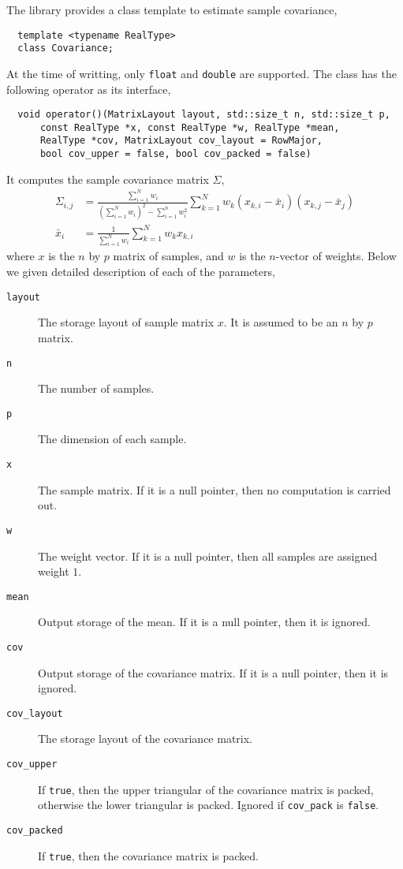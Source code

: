 The library provides a class template to estimate sample covariance,
\begin{Verbatim}
  template <typename RealType>
  class Covariance;
\end{Verbatim}
At the time of writting, only \verb|float| and \verb|double| are supported.
The class has the following operator as its interface,
\begin{Verbatim}
  void operator()(MatrixLayout layout, std::size_t n, std::size_t p,
      const RealType *x, const RealType *w, RealType *mean,
      RealType *cov, MatrixLayout cov_layout = RowMajor,
      bool cov_upper = false, bool cov_packed = false)
\end{Verbatim}
It computes the sample covariance matrix $\Sigma$,
\begin{align*}
  \Sigma_{i,j} &= \frac{\sum_{i=1}^N w_i}
  {(\sum_{i=1}^N w_i)^2 - \sum_{i=1}^n w_i^2}
  \sum_{k=1}^N w_k (x_{k,i} - \bar{x}_i)(x_{k,j} - \bar{x}_j) \\
  \bar{x}_i &= \frac{1}{\sum_{i=1}^N w_i}\sum_{k=1}^N w_k x_{k,i}
\end{align*}
where $x$ is the $n$ by $p$ matrix of samples, and $w$ is the $n$-vector of
weights. Below we given detailed description of each of the parameters,
\begin{description}
  \item[\texttt{layout}] The storage layout of sample matrix $x$. It is assumed
    to be an $n$ by $p$ matrix.
  \item[\texttt{n}] The number of samples.
  \item[\texttt{p}] The dimension of each sample.
  \item[\texttt{x}] The sample matrix. If it is a null pointer, then no
    computation is carried out.
  \item[\texttt{w}] The weight vector. If it is a null pointer, then all
    samples are assigned weight $1$.
  \item[\texttt{mean}] Output storage of the mean. If it is a null pointer,
    then it is ignored.
  \item[\texttt{cov}] Output storage of the covariance matrix. If it is a null
    pointer, then it is ignored.
  \item[\texttt{cov\_layout}] The storage layout of the covariance matrix.
  \item[\texttt{cov\_upper}] If \verb|true|, then the upper triangular of the
    covariance matrix is packed, otherwise the lower triangular is packed.
    Ignored if \verb|cov_pack| is \verb|false|.
  \item[\texttt{cov\_packed}] If \verb|true|, then the covariance matrix is
    packed.
\end{description}
